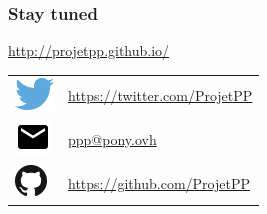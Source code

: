\documentclass[10pt, compress]{beamer}
\begin{document}
\newlength{\logosize}
\setlength{\logosize}{12pt}
\begin{frame}[fragile]
    \frametitle{Stay tuned}
    \alert{\url{http://projetpp.github.io/}}

    \begin{tabular}{ll}
        \includegraphics[width=\logosize]{Twitter_logo_blue.png} & \href{https://twitter.com/ProjetPP}{https://twitter.com/ProjetPP}\\
        \includegraphics[width=\logosize]{ic_email_black_18dp.png} & \href{mailto:ppp@pony.ovh}{ppp@pony.ovh}\\
        \includegraphics[width=\logosize]{GitHub-Mark-32px.png} &  \href{https://github.com/ProjetPP}{https://github.com/ProjetPP}\\
    \end{tabular}
\end{frame}

\end{document}
